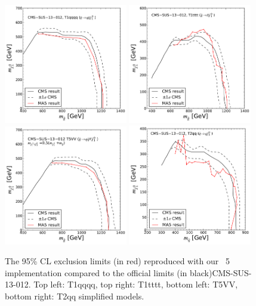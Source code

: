  \begin{figure}
        \centering
        \includegraphics[width=0.48\textwidth]{figures/Appendices/Ma5ValidationSUS13012/cms-012-limit-T1qqqq.pdf}
        \includegraphics[width=0.48\textwidth]{figures/Appendices/Ma5ValidationSUS13012/cms-012-limit-T1tttt.pdf}\\
        \includegraphics[width=0.48\textwidth]{figures/Appendices/Ma5ValidationSUS13012/cms-012-limit-T5VV.pdf}
        \includegraphics[width=0.48\textwidth]{figures/Appendices/Ma5ValidationSUS13012/cms-012-limit-T2qq.pdf}
\caption{The 95\% CL exclusion limits (in red) reproduced with our {}~5 implementation compared to the official limits (in black){CMS-SUS-13-012}. Top left: T1qqqq, top right: T1tttt, bottom left: T5VV, bottom right: T2qq simplified models.
\label{fig:limitplots}}
        \end{figure} 
